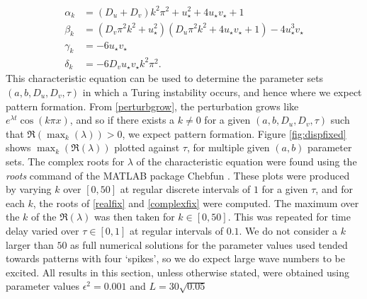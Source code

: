 \begin{align}
\alpha_k&=(D_u+D_v)k^2\pi^2+u_\star^2+4u_\star v_\star+1\\
\beta_k&=(D_v\pi^2k^2+u_\star^2)(D_u\pi^2k^2+4u_\star v_\star+1)-4u_\star^3v_\star\\
\gamma_k&=-6u_\star v_\star\\
\delta_k&=-6D_vu_\star v_\star k^2\pi^2.
\end{align}
This characteristic equation can be used to determine the parameter sets $(a,b,D_u,D_v,\tau)$ in which a Turing instability occurs, and hence where we expect pattern formation. From \eqref{perturbgrow}, the perturbation grows like $e^{\lambda t}\cos(k\pi x)$, and so if there exists a $k\neq0$ for a given $(a,b,D_u,D_v,\tau)$ such that $\Re(\max_k(\lambda))>0$, we expect pattern formation. Figure \ref{fig:dispfixed} shows $\max_k(\Re(\lambda))$ plotted against $\tau$, for multiple given $(a,b)$ parameter sets. The complex roots for $\lambda$ of the characteristic equation were found using the \emph{roots} command of the MATLAB package Chebfun \cite{chebfun}. These plots were produced by varying $k$ over $[0,50]$ at regular discrete intervals of $1$ for a given $\tau$, and for each $k$, the roots of \eqref{realfix} and \eqref{complexfix} were computed. The maximum over the $k$ of the $\Re(\lambda)$ was then taken for $k\in[0,50]$. This was repeated for time delay varied over $\tau\in[0,1]$ at regular intervals of $0.1$. We do not consider a $k$ larger than $50$ as full numerical solutions for the parameter values used tended towards patterns with four `spikes', so we do expect large wave numbers to be excited. All results in this section, unless otherwise stated, were obtained using parameter values $\epsilon^2=0.001$ and $L=30\sqrt{0.05}$

